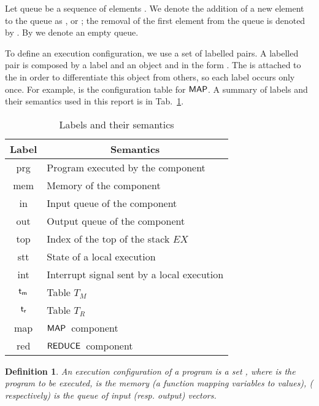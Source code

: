 \documentclass[10pt,a4paper,oneside]{article}
\newtheorem{definition}{Definition}[section]
\def\TAV{\ensuremath{T_{M}}}
\def\TPV{\ensuremath{T_{R}}}
\def\ST{{\ensuremath{EX}}}
\def\sanserif#1{\ensuremath{\sf #1}}
\def\REDUCE{\ensuremath{\sanserif{REDUCE}}}
\def\MAP{\ensuremath{\sanserif{MAP}}}
\def\lprog{{\sf prg}}
\def\lmem{{\sf mem}}
\def\linput{{\sf in}}
\def\loutput{{\sf out}}
\def\ltav{\ensuremath{{\sf t_{m}}}}
\def\ltpv{\ensuremath{{\sf t_{r}}}}
\def\ltop{{\sf top}}
\def\litr{{\sf int}}
\def\lmap{{\sf map}}
\def\lreduce{{\sf red}}
\def\lstate{{\sf stt}}
\begin{document}
Let queue  be a sequence of elements . We denote the addition of a new element to the queue  as , or ; the removal of the first element from the queue  is denoted by . By  we denote an empty queue.




To define an execution configuration, we use a set of labelled pairs. A labelled pair is composed by a label and an object and in the form . The  is attached to the  in order to differentiate this object from others, so each label occurs only once. For example,  is the configuration table for \MAP. A summary of labels and their semantics used in this report is in Tab.~\ref{tbl:label-semantics}.




\begin{table}
\centering
\caption{Labels and their semantics}
\label{tbl:label-semantics}
\begin{tabular}{|c|l|}
\hline
\textbf{Label} & \multicolumn{1}{c|}{\textbf{Semantics}} \\
\hline
\hline
\lprog & Program executed by the component \\
\hline
\lmem &  Memory of the component \\
\hline
\linput & Input queue of the component \\
\hline
\loutput & Output queue of the component \\
\hline
\ltop & Index of the top of the stack \ST \\
\hline
\lstate & State of a local execution \\
\hline
\litr & Interrupt signal sent by a local execution\\
\hline
\ltav & Table \TAV \\
\hline
\ltpv & Table \TPV \\
\hline
\lmap & \MAP\ component \\
\hline
\lreduce & \REDUCE\ component\\
\hline
\end{tabular}
\end{table}


\begin{definition}\label{def:execConf}
An \emph{execution configuration} of a program is a set , where  is the program to be executed,   is the memory (a function mapping variables to values),  ( respectively) is the queue of input (resp. output) vectors.
\end{definition}
\end{document}

